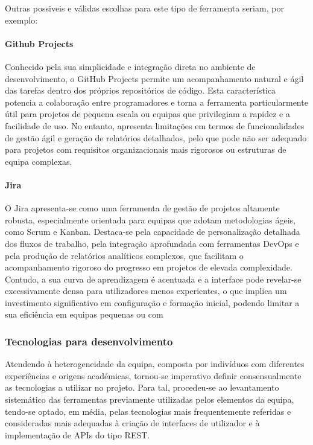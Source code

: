 Outras possiveis e válidas escolhas para este tipo de ferramenta seriam, por exemplo:

\paragraph{Github Projects}

Conhecido pela sua simplicidade e integração direta no ambiente de desenvolvimento, o GitHub Projects permite um acompanhamento natural e ágil das tarefas dentro dos próprios repositórios de código. Esta característica potencia a colaboração entre programadores e torna a ferramenta particularmente útil para projetos de pequena escala ou equipas que privilegiam a rapidez e a facilidade de uso. No entanto, apresenta limitações em termos de funcionalidades de gestão ágil e geração de relatórios detalhados, pelo que pode não ser adequado para projetos com requisitos organizacionais mais rigorosos ou estruturas de equipa complexas.

\paragraph{Jira}

O Jira apresenta-se como uma ferramenta de gestão de projetos altamente robusta, especialmente orientada para equipas que adotam metodologias ágeis, como Scrum e Kanban. Destaca-se pela capacidade de personalização detalhada dos fluxos de trabalho, pela integração aprofundada com ferramentas DevOps e pela produção de relatórios analíticos complexos, que facilitam o acompanhamento rigoroso do progresso em projetos de elevada complexidade. Contudo, a sua curva de aprendizagem é acentuada e a interface pode revelar-se excessivamente densa para utilizadores menos experientes, o que implica um investimento significativo em configuração e formação inicial, podendo limitar a sua eficiência em equipas pequenas ou com 


\subsubsection{Tecnologias para desenvolvimento}

Atendendo à heterogeneidade da equipa, composta por indivíduos com diferentes experiências e origens académicas, tornou-se imperativo definir consensualmente as tecnologias a utilizar no projeto. Para tal, procedeu-se ao levantamento sistemático das ferramentas previamente utilizadas pelos elementos da equipa, tendo-se optado, em média, pelas tecnologias mais frequentemente referidas e consideradas mais adequadas à criação de interfaces de utilizador e à implementação de APIs do tipo REST.

